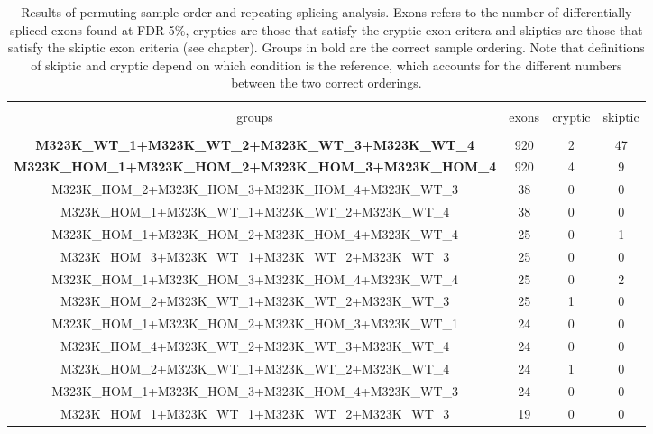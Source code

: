 \begin{appendices}
\begin{figure}[h]
	\label{fig:RNAmap_splicing}
\end{figure}



\begin{table}[!htbp] \centering 
	
	\footnotesize
	\caption{Results of permuting sample order and repeating splicing analysis. Exons refers to the number of differentially spliced exons found at FDR 5\%, cryptics are those that satisfy the cryptic exon critera and skiptics are those that satisfy the skiptic exon criteria (see chapter). Groups in bold are the correct sample ordering. Note that definitions of skiptic and cryptic depend on which condition is the reference, which accounts for the different numbers between the two correct orderings. } 
	\label{append:permutations} 
	\begin{tabular}{@{\extracolsep{5pt}} cccc} 
		\\[-1.8ex]\hline 
		\hline \\[-1.8ex] 
		groups & exons & cryptic & skiptic \\ 
		\hline \\[-1.8ex] 
		\textbf{M323K\_WT\_1+M323K\_WT\_2+M323K\_WT\_3+M323K\_WT\_4} & 920 & 2 & 47 \\ 
		\textbf{M323K\_HOM\_1+M323K\_HOM\_2+M323K\_HOM\_3+M323K\_HOM\_4} & 920 & 4 & 9 \\ 
		M323K\_HOM\_2+M323K\_HOM\_3+M323K\_HOM\_4+M323K\_WT\_3 & 38 & 0 & 0 \\ 
		M323K\_HOM\_1+M323K\_WT\_1+M323K\_WT\_2+M323K\_WT\_4 & 38 & 0 & 0 \\ 
		M323K\_HOM\_1+M323K\_HOM\_2+M323K\_HOM\_4+M323K\_WT\_4 & 25 & 0 & 1 \\ 
		M323K\_HOM\_3+M323K\_WT\_1+M323K\_WT\_2+M323K\_WT\_3 & 25 & 0 & 0 \\ 
		M323K\_HOM\_1+M323K\_HOM\_3+M323K\_HOM\_4+M323K\_WT\_4 & 25 & 0 & 2 \\ 
		M323K\_HOM\_2+M323K\_WT\_1+M323K\_WT\_2+M323K\_WT\_3 & 25 & 1 & 0 \\ 
		M323K\_HOM\_1+M323K\_HOM\_2+M323K\_HOM\_3+M323K\_WT\_1 & 24 & 0 & 0 \\ 
		M323K\_HOM\_4+M323K\_WT\_2+M323K\_WT\_3+M323K\_WT\_4 & 24 & 0 & 0 \\ 
		M323K\_HOM\_2+M323K\_WT\_1+M323K\_WT\_2+M323K\_WT\_4 & 24 & 1 & 0 \\ 
		M323K\_HOM\_1+M323K\_HOM\_3+M323K\_HOM\_4+M323K\_WT\_3 & 24 & 0 & 0 \\ 
		M323K\_HOM\_1+M323K\_WT\_1+M323K\_WT\_2+M323K\_WT\_3 & 19 & 0 & 0 \\ 

\end{tabular}
\end{table}
\end{appendices}
